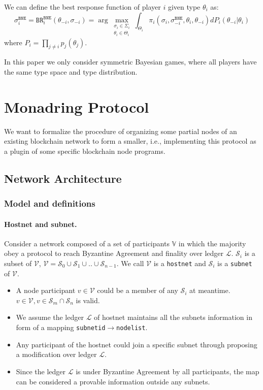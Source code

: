 \documentclass[11pt]{article}
\begin{document}
We can define the best response function of player $i$ given type $\theta_i$ as:
\begin{equation}
\sigma^\texttt{BNE}_i=\texttt{BR}^\texttt{BNE}_i(\theta_{-i},\sigma_{-i}) = \arg\max_{\substack{\sigma_i \in \Sigma_i \\ \theta_i\in \Theta_i}} \int_{\Theta_i} \pi_i(\sigma_i,\sigma^\texttt{BNE}_{-i},\theta_i,\theta_{-i})dP_i(\theta_{-i}|\theta_i)
\end{equation}
where $P_i=\prod_{j\neq i}p_j(\theta_j)$.

In this paper we only consider symmetric Bayesian games, where all players have the same type space and type distribution.

\section{Monadring Protocol}
We want to formalize the procedure of organizing some partial nodes of an existing blockchain network to form a smaller, i.e., implementing this protocol as a plugin of some specific blockchain node programs.
\subsection{Network Architecture}
\subsubsection{Model and definitions}
\paragraph{Hostnet and subnet.}
Consider a network composed of a set of participants $\mathbb{V}$ in which the majority obey a protocol to reach Byzantine Agreement and finality\cite{grandpa} over ledger $\mathcal{L}$.
$\mathcal{S}_{i}$ is a subset of $\mathcal{V}$, \( \mathcal{V} = \mathcal{S}_{0} \cup \mathcal{S}_{1} \cup .. \cup \mathcal{S}_{n-1}  \).
We call $\mathcal{V}$ is a \texttt{hostnet} and $\mathcal{S}_{i}$ is a \texttt{subnet} of $\mathcal{V}$.
\begin{itemize}
\item A node participant \( v \in \mathcal{V} \) could be a member of any $\mathcal{S}_{i}$ at meantime.\( v \in \mathcal{V}, v \in \mathcal{S}_{m} \cap \mathcal{S}_{n} \) is valid.
\item We assume the ledger $\mathcal{L}$ of hostnet maintains all the subnets information in form of a mapping \texttt{subnetid}\( \rightarrow \)\texttt{nodelist}.
\item Any participant of the hostnet could join a specific subnet through proposing a modification over ledger $\mathcal{L}$.
\item Since the ledger $\mathcal{L}$ is under Byzantine Agreement by all participants, the map can be considered a provable information outside any subnets.
\end{itemize}
\end{document}
